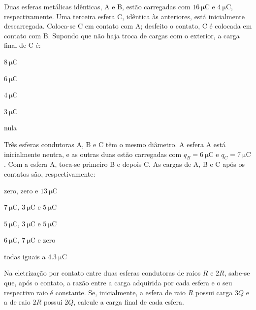 \begin{questao}[3]{}

Duas esferas metálicas idênticas, A e B, estão carregadas com
$\SI{16}{\micro\coulomb}$ e $\SI{4}{\micro\coulomb}$, respectivamente. Uma terceira
esfera C, idêntica às anteriores, está inicialmente descarregada. Coloca-se C em
contato com A; desfeito o contato, C é colocada em contato com B. Supondo que não
haja troca de cargas com o exterior, a carga final de C é:
\begin{alternativas}[3]
\item $\SI{8}{\micro\coulomb}$
\item $\SI{6}{\micro\coulomb}$
\item $\SI{4}{\micro\coulomb}$
\item $\SI{3}{\micro\coulomb}$
\item nula
\end{alternativas}


\end{questao}
\begin{questao}[3]{}

Três esferas condutoras A, B e C têm o mesmo diâmetro. A esfera A está
inicialmente neutra, e as outras duas estão carregadas com
$q_B = \SI{6}{\micro\coulomb}$ e $q_C = \SI{7}{\micro\coulomb}$. Com a esfera A,
toca-se primeiro B e depois C. As cargas de A, B e C após os contatos são,
respectivamente:
\begin{alternativas}
\item zero, zero e $\SI{13}{\micro\coulomb}$
\item $\SI{7}{\micro\coulomb}$, $\SI{3}{\micro\coulomb}$ e $\SI{5}{\micro\coulomb}$
\item $\SI{5}{\micro\coulomb}$, $\SI{3}{\micro\coulomb}$ e $\SI{5}{\micro\coulomb}$
\item $\SI{6}{\micro\coulomb}$, $\SI{7}{\micro\coulomb}$ e zero
\item todas iguais a $\SI{4.3}{\micro\coulomb}$
\end{alternativas}


\end{questao}
\begin{questao}[3]{}

Na eletrização por contato entre duas esferas condutoras de raios $R$ e $2R$,
sabe-se que, após o contato, a razão entre a carga adquirida por cada esfera e o
seu respectivo raio é constante. Se, inicialmente, a esfera de raio $R$ possui
carga $3Q$ e a de raio $2R$ possui $2Q$, calcule a carga final de cada esfera.


\end{questao}
